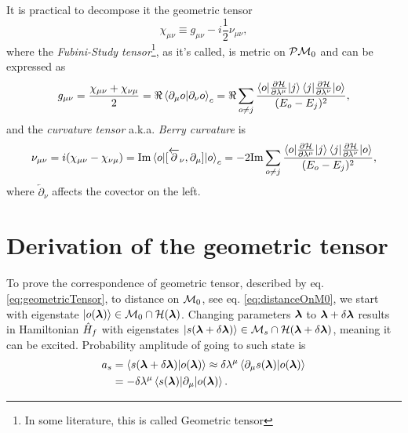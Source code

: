It is practical to decompose it the geometric tensor
\begin{equation}
    \chi_{\mu\nu} \equiv g_{\mu\nu} - i\frac{1}{2} \nu_{\mu\nu},
\end{equation}
where the \emph{Fubini-Study tensor}\footnote{In some literature, this is called Geometric tensor}, as it's called, is metric on $\mathcal{P}\mathcal{M}_0$ and can be expressed as
\begin{equation}
    g_{\mu\nu} = \frac{\chi_{\mu\nu}+\chi_{\nu\mu}}{2} = \Re\braket{\partial_\mu o|\partial_\nu o}_c = \Re \sum_{o\neq j}\frac{\braket{o|\frac{\partial \mathcal{H}}{\partial \lambda^\mu}|j}\braket{j|\frac{\partial \mathcal{H}}{\partial \lambda^\nu}|o}}{(E_o-E_j)^2},
    \label{eq:metrictensorREdefinition}
\end{equation}
and the \emph{curvature tensor} a.k.a. \emph{Berry curvature} is
\begin{equation}
        \nu_{\mu\nu} = i(\chi_{\mu\nu}-\chi_{\nu\mu})= \textrm{Im}\braket{o|[\overleftarrow{\partial}_\nu,\partial_\mu]|o}_c = -2 \textrm{Im} \sum_{o\neq j}\frac{\braket{o|\frac{\partial \mathcal{H}}{\partial \lambda^\mu}|j}\braket{j|\frac{\partial \mathcal{H}}{\partial \lambda^\nu}|o}}{(E_o-E_j)^2},
    \label{eq:geom.tensorREdefinition}
\end{equation}
where $\overleftarrow{\partial}_\nu$ affects the covector on the left.


\section{Derivation of the geometric tensor}
\label{sec:derivationOfGeometricTensor}
To prove the correspondence of geometric tensor, described by eq. \ref{eq:geometricTensor}, to distance on $\mathcal{M}_0$, see eq. \ref{eq:distanceOnM0}, we start with eigenstate $\ket{o({\bm\lambda})}\in \mathcal{M}_0\cap \mathcal{H}({\bm\lambda})$. Changing parameters ${\bm\lambda}$ to ${\bm\lambda}+\delta {\bm\lambda}$ results in Hamiltonian $\hat{H}_f$ with eigenstates $\ket{s({\bm\lambda}+\delta {\bm\lambda})}\in \mathcal{M}_s\cap\mathcal{H}({\bm\lambda}+\delta {\bm\lambda})$, meaning it can be excited. Probability amplitude of going to such state is
\begin{equation}
    \begin{split}
        a_s&=\braket{s({\bm\lambda}+\delta{\bm\lambda})|o({\bm\lambda})}\approx \delta\lambda^\mu\braket{\partial_\mu s({\bm\lambda})|o({\bm\lambda})} \\
        &= -\delta\lambda^\mu\braket{s({\bm\lambda})|\partial_\mu|o({\bm\lambda})}.
    \end{split}
\end{equation}

